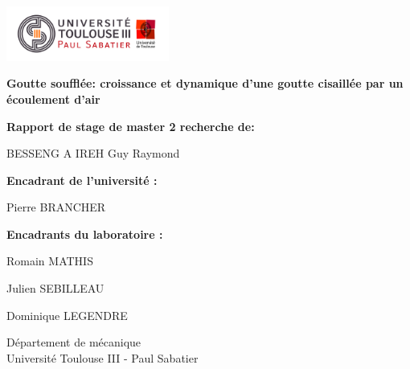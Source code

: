 \begin{titlepage}
  \includegraphics[width=0.4\textwidth]{Logo_UT3.jpg}
    \begin{center}


      \LARGE
        \textbf{Goutte soufflée: croissance et dynamique d'une goutte cisaillée par un écoulement d'air}


        \vspace{1.5cm}
        \textbf{Rapport de stage de master 2 recherche de:}
        
        BESSENG A IREH Guy Raymond

        \vspace{0.8cm}
        \textbf{Encadrant de l'université :}

        Pierre BRANCHER

        \vspace{0.8cm}
        \textbf{Encadrants du laboratoire :}

        Romain MATHIS

        Julien SEBILLEAU

        Dominique LEGENDRE

        \vfill

        
        \Large
        Département de mécanique\\
        Université Toulouse III - Paul Sabatier\\
        \date{}

    \end{center}
\end{titlepage}
